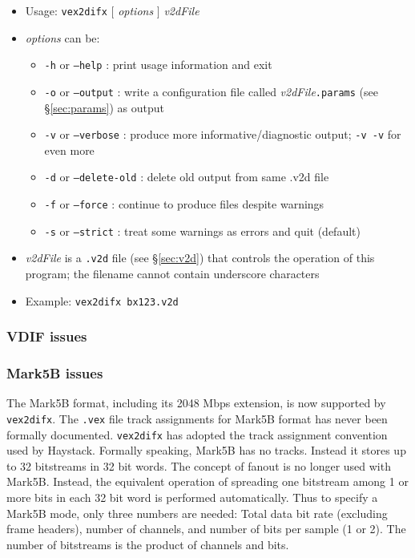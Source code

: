 \begin{itemize}
\item[] Usage: {\tt vex2difx} $[$ {\em options} $]$ {\em v2dFile}
\item[] {\em options} can be:
\begin{itemize}
\item[] {\tt -h} or {\tt --help} : print usage information and exit
\item[] {\tt -o} or {\tt --output} : write a configuration file called {\em v2dFile}{\tt .params} (see \S\ref{sec:params}) as output
\item[] {\tt -v} or {\tt --verbose} : produce more informative/diagnostic output; {\tt -v -v} for even more
\item[] {\tt -d} or {\tt --delete-old} : delete old output from same .v2d file
\item[] {\tt -f} or {\tt --force} : continue to produce files despite warnings
\item[] {\tt -s} or {\tt --strict} : treat some warnings as errors and quit (default)
\end{itemize}
\item[] {\em v2dFile} is a {\tt .v2d} file (see \S\ref{sec:v2d}) that controls the operation of this program; the filename cannot contain underscore characters
\item[] Example: {\tt vex2difx bx123.v2d}
\end{itemize}

\subsubsection{VDIF issues}


\subsubsection{Mark5B issues}

The Mark5B format, including its 2048 Mbps extension, is now supported by {\tt vex2difx}. 
The {\tt .vex} file track assignments for Mark5B format has never been formally documented.
{\tt vex2difx} has adopted the track assignment convention used by Haystack. 
Formally speaking, Mark5B has no tracks. 
Instead it stores up to 32 bitstreams in 32 bit words. 
The concept of fanout is no longer used with Mark5B. 
Instead, the equivalent operation of spreading one bitstream among 1 or more bits in each 32 bit word is performed automatically. 
Thus to specify a Mark5B mode, only three numbers are needed: Total data bit rate (excluding frame headers), number of channels, and number of bits per sample (1 or 2). 
The number of bitstreams is the product of channels and bits.

